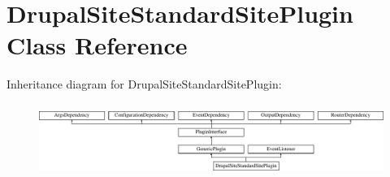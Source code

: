 \hypertarget{classDrupalSiteStandardSitePlugin}{\section{Drupal\-Site\-Standard\-Site\-Plugin Class Reference}
\label{classDrupalSiteStandardSitePlugin}
}
Inheritance diagram for Drupal\-Site\-Standard\-Site\-Plugin\-:\begin{figure}[H]
\begin{center}
\leavevmode
\includegraphics[height=2.408602cm]{classDrupalSiteStandardSitePlugin}
\end{center}
\end{figure}
